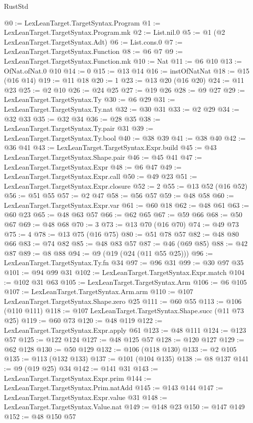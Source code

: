 \begin{lexlean}{RustStd}
\begin{coremodule}
{\begin{coremodule}
{{{{{{{{{@0 := LexLeanTarget.TargetSyntax.Program
@1 := LexLeanTarget.TargetSyntax.Program.mk
@2 := List.nil.{0}
@5 := @1 (@2 LexLeanTarget.TargetSyntax.Adt)
@6 := List.cons.{0}
@7 := LexLeanTarget.TargetSyntax.Function
@8 := @6 @7
@9 := LexLeanTarget.TargetSyntax.Function.mk
@10 := Nat
@11 := @6 @10
@13 := OfNat.ofNat.{0} @10
@14 := 0
@15 := @13 @14
@16 := instOfNatNat
@18 := @15 (@16 @14)
@19 := @11 @18
@20 := 1
@23 := @13 @20 (@16 @20)
@24 := @11 @23
@25 := @2 @10
@26 := @24 @25
@27 := @19 @26
@28 := @9 @27
@29 := LexLeanTarget.TargetSyntax.Ty
@30 := @6 @29
@31 := LexLeanTarget.TargetSyntax.Ty.nat
@32 := @30 @31
@33 := @2 @29
@34 := @32 @33
@35 := @32 @34
@36 := @28 @35
@38 := LexLeanTarget.TargetSyntax.Ty.pair @31
@39 := LexLeanTarget.TargetSyntax.Ty.bool
@40 := @38 @39
@41 := @38 @40
@42 := @36 @41
@43 := LexLeanTarget.TargetSyntax.Expr.build
@45 := @43 LexLeanTarget.TargetSyntax.Shape.pair
@46 := @45 @41
@47 := LexLeanTarget.TargetSyntax.Expr
@48 := @6 @47
@49 := LexLeanTarget.TargetSyntax.Expr.call
@50 := @49 @23
@51 := LexLeanTarget.TargetSyntax.Expr.closure
@52 := 2
@55 := @13 @52 (@16 @52)
@56 := @51 @55
@57 := @2 @47
@58 := @56 @57
@59 := @48 @58
@60 := LexLeanTarget.TargetSyntax.Expr.var
@61 := @60 @18
@62 := @48 @61
@63 := @60 @23
@65 := @48 @63 @57
@66 := @62 @65
@67 := @59 @66
@68 := @50 @67
@69 := @48 @68
@70 := 3
@73 := @13 @70 (@16 @70)
@74 := @49 @73
@75 := 4
@78 := @13 @75 (@16 @75)
@80 := @51 @78 @57
@82 := @48 @80 @66
@83 := @74 @82
@85 := @48 @83 @57
@87 := @46 (@69 @85)
@88 := @42 @87
@89 := @8 @88
@94 := @9 (@19 (@24 (@11 @55 @25)))
@96 := LexLeanTarget.TargetSyntax.Ty.fn @34
@97 := @96 @31
@99 := @30 @97 @35
@101 := @94 @99 @31
@102 := LexLeanTarget.TargetSyntax.Expr.match
@104 := @102 @31 @63
@105 := LexLeanTarget.TargetSyntax.Arm
@106 := @6 @105
@107 := LexLeanTarget.TargetSyntax.Arm.arm
@110 := @107 LexLeanTarget.TargetSyntax.Shape.zero @25
@111 := @60 @55
@113 := @106 (@110 @111)
@118 := @107 LexLeanTarget.TargetSyntax.Shape.succ (@11 @73 @25)
@119 := @60 @73
@120 := @48 @119
@122 := LexLeanTarget.TargetSyntax.Expr.apply @61
@123 := @48 @111
@124 := @123 @57
@125 := @122 @124
@127 := @48 @125 @57
@128 := @120 @127
@129 := @62 @128
@130 := @50 @129
@132 := @106 (@118 @130)
@133 := @2 @105
@135 := @113 (@132 @133)
@137 := @101 (@104 @135)
@138 := @8 @137
@141 := @9 (@19 @25) @34
@142 := @141 @31
@143 := LexLeanTarget.TargetSyntax.Expr.prim
@144 := LexLeanTarget.TargetSyntax.Prim.natAdd
@145 := @143 @144
@147 := LexLeanTarget.TargetSyntax.Expr.value @31
@148 := LexLeanTarget.TargetSyntax.Value.nat
@149 := @148 @23
@150 := @147 @149
@152 := @48 @150 @57
}}}}}}}}}
\end{coremodule}}
\end{coremodule}
\end{lexlean}
